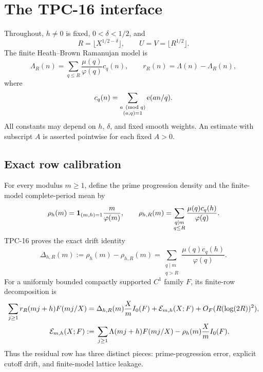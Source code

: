 \section{The TPC-16 interface}
\label{sec:setup}

Throughout, $h\ne0$ is fixed, $0<\delta<1/2$, and
\begin{equation}
 R=\lfloor X^{1/2-\delta}\rfloor,
 \qquad
 U=V=\lfloor R^{1/2}\rfloor.
 \label{eq:basic-parameters}
\end{equation}
The finite Heath--Brown Ramanujan model is
\begin{equation}
 \Lambda_R(n)=\sum_{q\le R}\frac{\mu(q)}{\varphi(q)}c_q(n),
 \qquad
 r_R(n)=\Lambda(n)-\Lambda_R(n),
 \label{eq:finite-model}
\end{equation}
where
\begin{equation}
 c_q(n)=\sum_{\substack{a\pmod q\\(a,q)=1}}\mathrm e(an/q).
 \label{eq:ramanujan-sum}
\end{equation}
All constants may depend on $h$, $\delta$, and fixed smooth weights.
An estimate with subscript $A$ is asserted pointwise for each fixed
$A>0$.

\subsection{Exact row calibration}

For every modulus $m\ge1$, define the prime progression density and the
finite-model complete-period mean by
\begin{equation}
 \rho_h(m)=\mathbf 1_{(m,h)=1}\frac{m}{\varphi(m)},
 \qquad
 \rho_{h,R}(m)=
 \sum_{\substack{q\mid m\\q\le R}}
 \frac{\mu(q)c_q(h)}{\varphi(q)}.
 \label{eq:row-densities}
\end{equation}
TPC-16 proves the exact drift identity
\begin{equation}
 \Delta_{h,R}(m)
 :=\rho_h(m)-\rho_{h,R}(m)
 =\sum_{\substack{q\mid m\\q>R}}
 \frac{\mu(q)c_q(h)}{\varphi(q)}.
 \label{eq:row-drift}
\end{equation}
For a uniformly bounded compactly supported $C^1$ family $F$, its
finite-row decomposition is
\begin{align}
 \sum_{j\ge1}r_R(mj+h)F(mj/X)
 ={}&\Delta_{h,R}(m)\frac Xm I_0(F)
     +\mathcal E_{m,h}(X;F)
     +O_F(R(\log(2R))^2),
 \label{eq:row-decomposition}\\
 \mathcal E_{m,h}(X;F)
 :={}&
 \sum_{j\ge1}\Lambda(mj+h)F(mj/X)
 -\rho_h(m)\frac Xm I_0(F).
 \label{eq:prime-row-error}
\end{align}
Thus the residual row has three distinct pieces: prime-progression
error, explicit cutoff drift, and finite-model lattice leakage.

